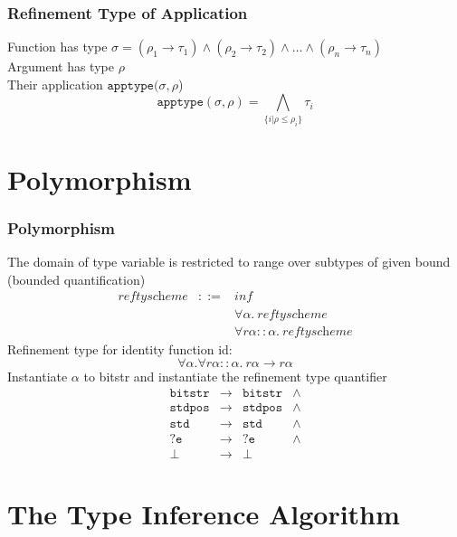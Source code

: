 \documentclass[dvipdfmx,cjk,xcolor=dvipsnames,envcountsect,notheorems,aspectratio=169]{beamer}
\theoremstyle{definition}
\begin{document}
\begin{frame}
	\frametitle{Refinement Type of Application}
	{\Large Function has type $\sigma = (\rho_1\to\tau_1) \land (\rho_2\to\tau_2) \land \ldots \land (\rho_n\to\tau_n)$ \\
	Argument has type $\rho$\\
	Their application $\texttt{apptype}(\sigma, \rho$)}
	\[\texttt{apptype}(\sigma, \rho)=\bigwedge_{\{i|\rho\leq\rho_i\}}\tau_i\]
\end{frame}

\section{Polymorphism}

\begin{frame}
	\frametitle{Polymorphism}
	{\Large The domain of type variable is restricted to range over subtypes of given bound (bounded quantification)}
	\[
		\begin{array}{lcl}
			\textit{reftyscheme} & ::= & \textit{inf} \\
													 & & \forall \alpha .~\textit{reftyscheme} \\
													 & & \forall r\alpha :: \alpha.~\textit{reftyscheme}
		\end{array}
	\]
	{\Large Refinement type for identity function id:}
	\[
		\forall \alpha. \forall r\alpha :: \alpha.~r\alpha \to r\alpha
	\]
	{\Large Instantiate $\alpha$ to bitstr and instantiate the refinement type quantifier}
	\[
		\begin{array}{cccl}
			\texttt{bitstr} & \to & \texttt{bitstr} & \land \\
			\texttt{stdpos} & \to & \texttt{stdpos} & \land \\
			\texttt{std} & \to & \texttt{std} & \land \\
			?\texttt{e} & \to & ?\texttt{e} & \land \\
			\bot & \to & \bot & 
		\end{array}
	\]
\end{frame}

\section{The Type Inference Algorithm}
\end{document}
